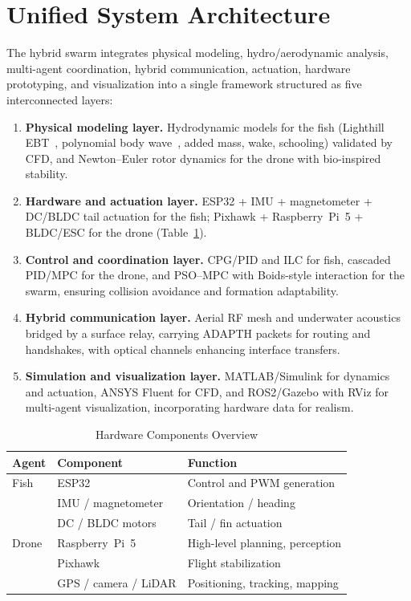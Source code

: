 \documentclass[journal]{IEEEtran}
\begin{document}
\section{Unified System Architecture}
\label{sec:arch}
The hybrid swarm integrates physical modeling, hydro/aerodynamic analysis,
multi-agent coordination, hybrid communication, actuation, hardware
prototyping, and visualization into a single framework structured as five
interconnected layers:
\begin{enumerate}
  \item \textbf{Physical modeling layer.} Hydrodynamic models for the fish
  (Lighthill EBT~\cite{lighthill1971large}, polynomial body
  wave~\cite{majeed2014dynamic}, added mass, wake, schooling) validated by CFD,
  and Newton--Euler rotor dynamics for the drone with bio-inspired stability.
  \item \textbf{Hardware and actuation layer.} ESP32 + IMU + magnetometer +
  DC/BLDC tail actuation for the fish; Pixhawk + Raspberry~Pi~5 + BLDC/ESC for
  the drone (Table~\ref{tab:hw}).
  \item \textbf{Control and coordination layer.} CPG/PID and ILC for fish,
  cascaded PID/MPC for the drone, and PSO--MPC with Boids-style interaction for
  the swarm, ensuring collision avoidance and formation adaptability.
  \item \textbf{Hybrid communication layer.} Aerial RF mesh and underwater
  acoustics bridged by a surface relay, carrying ADAPTH packets for routing and
  handshakes, with optical channels enhancing interface transfers.
  \item \textbf{Simulation and visualization layer.} MATLAB/Simulink for
  dynamics and actuation, ANSYS Fluent for CFD, and ROS2/Gazebo with RViz for
  multi-agent visualization, incorporating hardware data for realism.
\end{enumerate}

\begin{table}[!t]
\centering
\caption{Hardware Components Overview}
\label{tab:hw}
\begin{tabular}{lll}
\toprule
Agent & Component & Function\\
\midrule
Fish  & ESP32                & Control and PWM generation\\
      & IMU / magnetometer   & Orientation / heading\\
      & DC / BLDC motors     & Tail / fin actuation\\
\midrule
Drone & Raspberry~Pi~5       & High-level planning, perception\\
      & Pixhawk              & Flight stabilization\\
      & GPS / camera / LiDAR & Positioning, tracking, mapping\\
\bottomrule
\end{tabular}
\end{table}
\end{document}

